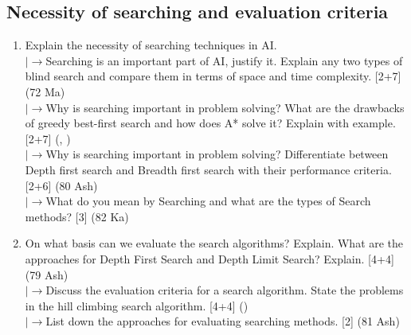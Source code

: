 \documentclass[12pt]{article}
\newcommand{\lb}{\\$\left|\rightarrow\right.$}
\begin{document}
  \subsection{Necessity of searching and evaluation criteria}
    \begin{enumerate}[topsep=0pt, noitemsep]
      \item Explain the necessity of searching techniques in AI.
        \lb Searching is an important part of AI, justify it. Explain any two types of blind search and compare them in terms of space and time complexity. \hfill [2+7] (72 Ma)
        \lb Why is searching important in problem solving? What are the drawbacks of greedy best-first search and how does A* solve it? Explain with example. \hfill [2+7] (, )
        \lb Why is searching important in problem solving? Differentiate between Depth first search and Breadth first search with their performance criteria. \hfill [2+6] (80 Ash)
        \lb What do you mean by Searching and what are the types of Search methods? \hfill [3] (82 Ka)

      \item On what basis can we evaluate the search algorithms? Explain. What are the approaches for Depth First Search and Depth Limit Search? Explain. \hfill [4+4] (79 Ash)
        \lb Discuss the evaluation criteria for a search algorithm. State the problems in the hill climbing search algorithm. \hfill [4+4] ()
        \lb List down the approaches for evaluating searching methods. \hfill [2] (81 Ash)
    \end{enumerate}
\end{document}
